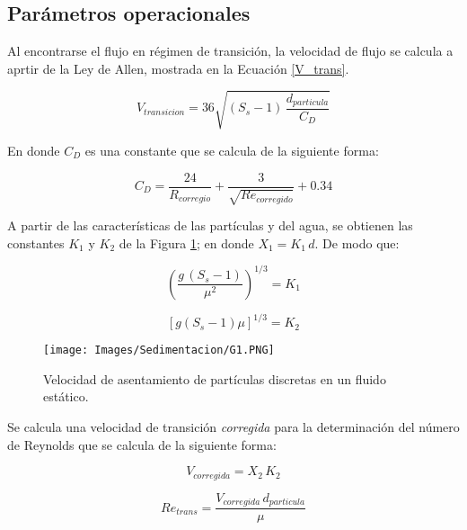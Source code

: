 \subsection{Par\'ametros operacionales}

\noindent
\justify

Al encontrarse el flujo en r\'egimen de transici\'on, la velocidad de flujo se calcula a aprtir de la Ley de Allen, mostrada en la Ecuaci\'on \ref{V_trans}.

\begin{equation}
	V_{transicion} = 36 \sqrt{(S_s-1) \, \frac{d_{particula}}{C_D}}
	\label{V_trans}
\end{equation}


\noindent
\justify

En donde $C_D$ es una constante que se calcula de la siguiente forma:

\begin{equation}
	C_D = \frac{24}{R_{corregio}} + \frac{3}{\sqrt{Re_{corregido}}} + 0.34
	\label{C_D}
\end{equation}

\noindent
\justify

A partir de las caracter\'isticas de las part\'iculas y del agua, se obtienen las constantes $K_1$ y $K_2$ de la Figura \ref{G1}; en donde $X_1 = K_1  \, d$. De modo que:

\begin{equation*}
	\left( \frac{g \, (S_s-1)}{\mu ^2} \right) ^{1/3} = K_1
\end{equation*}

\begin{equation*}
	\left[ g (S_s-1) \mu \right] ^{1/3} = K_2
\end{equation*} 

\begin{figure}[h!]
	\centering
	\texttt{[image: Images/Sedimentacion/G1.PNG]}
	\caption{Velocidad de asentamiento de part\'iculas discretas en un fluido est\'atico.}
	\label{G1}
\end{figure}

\noindent
\justify

Se calcula una velocidad de transici\'on \textit{corregida} para la determinaci\'on del n\'umero de Reynolds que se calcula de la siguiente forma:

\begin{equation*}
	V_{corregida} = X_2 \, K_2
\end{equation*}

\begin{equation}
	Re_{trans} = \frac{V_{corregida} \, d_{particula}}{\mu}
\end{equation}


